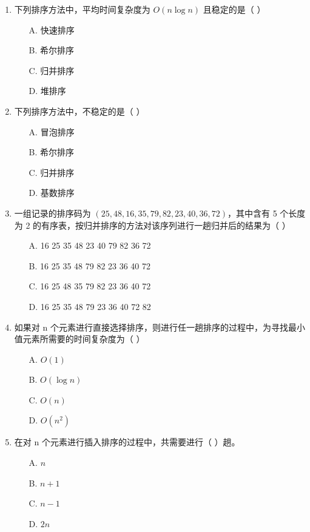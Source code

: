 \documentclass[12pt, a4paper]{article}
\begin{document}
\begin{enumerate}[label=\arabic*.]
	\item 下列排序方法中，平均时间复杂度为 $O(n \log n)$ 且稳定的是（ ）
	      \begin{enumerate}
		      \item[A.] 快速排序
		      \item[B.] 希尔排序
		      \item[C.] 归并排序
		      \item[D.] 堆排序
	      \end{enumerate}

	\item 下列排序方法中，不稳定的是（ ）
	      \begin{enumerate}
		      \item[A.] 冒泡排序
		      \item[B.] 希尔排序
		      \item[C.] 归并排序
		      \item[D.] 基数排序
	      \end{enumerate}

	\item 一组记录的排序码为 $(25, 48, 16, 35, 79, 82, 23, 40, 36, 72)$，其中含有 5 个长度为 2 的有序表，按归并排序的方法对该序列进行一趟归并后的结果为（ ）
	      \begin{enumerate}
		      \item[A.] 16 25 35 48 23 40 79 82 36 72
		      \item[B.] 16 25 35 48 79 82 23 36 40 72
		      \item[C.] 16 25 48 35 79 82 23 36 40 72
		      \item[D.] 16 25 35 48 79 23 36 40 72 82
	      \end{enumerate}

	\item 如果对 n 个元素进行直接选择排序，则进行任一趟排序的过程中，为寻找最小值元素所需要的时间复杂度为（ ）
	      \begin{enumerate}
		      \item[A.] $O(1)$
		      \item[B.] $O(\log n)$
		      \item[C.] $O(n)$
		      \item[D.] $O(n^2)$
	      \end{enumerate}

	\item 在对 n 个元素进行插入排序的过程中，共需要进行（ ）趟。
	      \begin{enumerate}
		      \item[A.] $n$
		      \item[B.] $n+1$
		      \item[C.] $n-1$
		      \item[D.] $2n$
	      \end{enumerate}


\end{enumerate}
\end{document}
